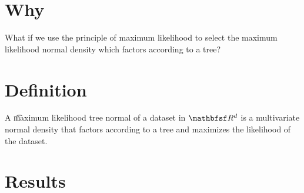 

\section*{Why}

What if we use the principle of maximum likelihood to select the maximum likelihood normal density which factors according to a tree?

\section*{Definition}

A \t{maximum likelihood tree normal} of a dataset in $\R ^d$ is a multivariate normal density that factors according to a tree and maximizes the likelihood of the dataset.

\section*{Results}

